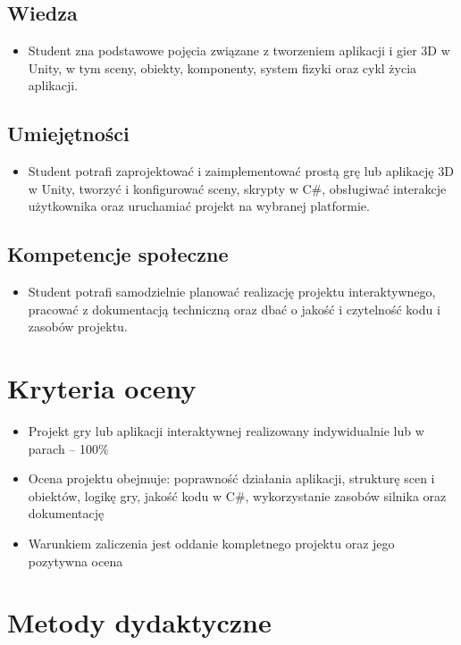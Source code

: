 \documentclass[12pt, a4paper]{article}
\begin{document}
\subsection*{Wiedza}
\begin{itemize}
  \item Student zna podstawowe pojęcia związane z tworzeniem aplikacji i gier 3D w Unity, w tym sceny, obiekty, komponenty, system fizyki oraz cykl życia aplikacji.
\end{itemize}

\subsection*{Umiejętności}
\begin{itemize}
  \item Student potrafi zaprojektować i zaimplementować prostą grę lub aplikację 3D w Unity, tworzyć i konfigurować sceny, skrypty w C\#, obsługiwać interakcje użytkownika oraz uruchamiać projekt na wybranej platformie.
\end{itemize}

\subsection*{Kompetencje społeczne}
\begin{itemize}
  \item Student potrafi samodzielnie planować realizację projektu interaktywnego, pracować z dokumentacją techniczną oraz dbać o jakość i czytelność kodu i zasobów projektu.
\end{itemize}

\section{Kryteria oceny}

\begin{itemize}
  \item Projekt gry lub aplikacji interaktywnej realizowany indywidualnie lub w parach – 100\%
  \item Ocena projektu obejmuje: poprawność działania aplikacji, strukturę scen i obiektów, logikę gry, jakość kodu w C\#, wykorzystanie zasobów silnika oraz dokumentację
  \item Warunkiem zaliczenia jest oddanie kompletnego projektu oraz jego pozytywna ocena
\end{itemize}

\section{Metody dydaktyczne}
\end{document}

